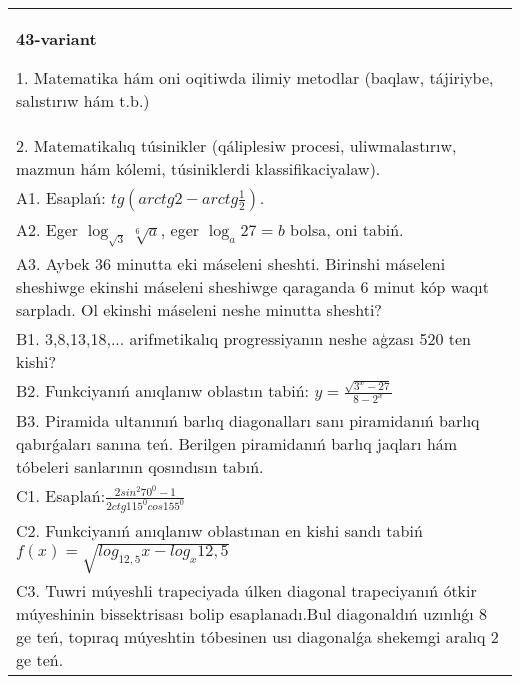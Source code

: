 \documentclass{article}
\begin{document}
\begin{tabular}{m{17cm}}
\textbf{43-variant}

1. Matematika hám oni oqitiwda ilimiy metodlar (baqlaw, tájiriybe, salıstırıw hám t.b.) \\
2. Matematikalıq túsinikler (qáliplesiw procesi, uliwmalastırıw, mazmun hám kólemi, túsiniklerdi klassifikaciyalaw). \\
A1. Esaplań: \(tg\left(arctg2 - arctg\frac{1}{2} \right) \). \\
A2. Eger \(\log_{\sqrt{3}}\sqrt[6]{a}\), eger \(\log_{a}27 = b\) bolsa, oni tabiń. \\
A3. Aybek 36 minutta eki máseleni sheshti. Birinshi máseleni sheshiwge ekinshi máseleni sheshiwge qaraganda 6 minut kóp waqıt sarpladı. Ol ekinshi máseleni neshe minutta sheshti? \\
B1. 3,8,13,18,... arifmetikalıq progressiyanın neshe aģzası 520 ten kishi? \\
B2. Funkciyanıń anıqlanıw oblastın tabiń: \(y = \frac{\sqrt{3^{x} - 27}}{8 - 2^{x}}\) \\
B3. Piramida ultanınıń barlıq diagonalları sanı piramidanıń barlıq qabırǵaları sanına teń. Berilgen piramidanıń barlıq jaqları hám tóbeleri sanlarının qosındısın tabıń. \\
C1. Esaplań:\(\frac{2sin^{2}70^{0} - 1}{2ctg115^{0}cos155^{0}}\) \\
C2. Funkciyanıń anıqlanıw oblastınan en kishi sandı tabiń \(f (x) = \sqrt{log_{12,5}x - log_{x}12,5}\) \\
C3. Tuwri múyeshli trapeciyada úlken diagonal trapeciyanıń ótkir múyeshinin bissektrisası bolip esaplanadı.Bul diagonaldıń uzınlıǵı 8 ge teń, topıraq múyeshtin tóbesinen usı diagonalǵa shekemgi aralıq 2 ge teń. \\

\end{tabular}
\vspace{1cm}
\end{document}
